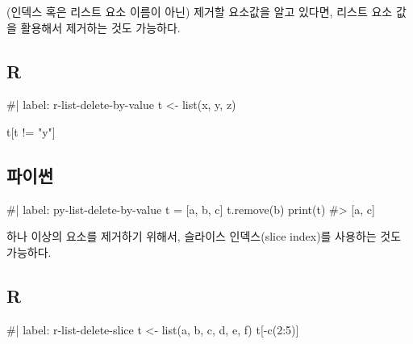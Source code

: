 \documentclass[
  letterpaper,
]{book}
\newenvironment{Shaded}{\begin{snugshade}}{\end{snugshade}}
\newcommand{\NormalTok}[1]{\textcolor[rgb]{0.00,0.23,0.31}{#1}}
\begin{document}
(인덱스 혹은 리스트 요소 이름이 아닌) 제거할 요소값을 알고 있다면,
리스트 요소 값을 활용해서 제거하는 것도 가능하다.

\subsection{R}

\begin{Shaded}
\begin{Highlighting}[]
\NormalTok{\#| label: r{-}list{-}delete{-}by{-}value}
\NormalTok{t \textless{}{-} list(\textquotesingle{}x\textquotesingle{}, \textquotesingle{}y\textquotesingle{}, \textquotesingle{}z\textquotesingle{})}

\NormalTok{t[t != "y"]}
\end{Highlighting}
\end{Shaded}

\subsection{파이썬}

\begin{Shaded}
\begin{Highlighting}[]
\NormalTok{\#| label: py{-}list{-}delete{-}by{-}value}
\NormalTok{t = [\textquotesingle{}a\textquotesingle{}, \textquotesingle{}b\textquotesingle{}, \textquotesingle{}c\textquotesingle{}]}
\NormalTok{t.remove(\textquotesingle{}b\textquotesingle{})}
\NormalTok{print(t)}
\NormalTok{\#\textgreater{} [\textquotesingle{}a\textquotesingle{}, \textquotesingle{}c\textquotesingle{}]}
\end{Highlighting}
\end{Shaded}

하나 이상의 요소를 제거하기 위해서, 슬라이스 인덱스(slice index)를
사용하는 것도 가능하다.

\subsection{R}

\begin{Shaded}
\begin{Highlighting}[]
\NormalTok{\#| label: r{-}list{-}delete{-}slice}
\NormalTok{t \textless{}{-} list(\textquotesingle{}a\textquotesingle{}, \textquotesingle{}b\textquotesingle{}, \textquotesingle{}c\textquotesingle{}, \textquotesingle{}d\textquotesingle{}, \textquotesingle{}e\textquotesingle{}, \textquotesingle{}f\textquotesingle{})}
\NormalTok{t[{-}c(2:5)]}
\end{Highlighting}
\end{Shaded}
\end{document}
